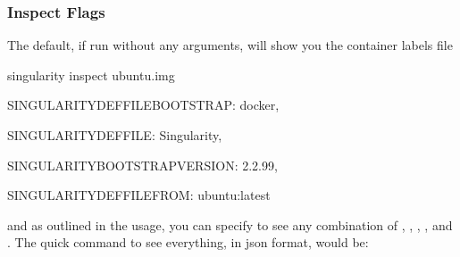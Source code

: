 \documentclass[letterpaper,10pt,english]{sphinxmanual}
\begin{document}
\subsubsection{Inspect Flags}
\label{\detokenize{appendix:inspect-flags}}
The default, if run without any arguments, will show you the container
labels file

%
\begin{sphinxVerbatim}[commandchars=\\\{\}]
\PYGZdl{} singularity inspect ubuntu.img

\PYGZob{}

    \PYGZdq{}SINGULARITY\PYGZus{}DEFFILE\PYGZus{}BOOTSTRAP\PYGZdq{}: \PYGZdq{}docker\PYGZdq{},

    \PYGZdq{}SINGULARITY\PYGZus{}DEFFILE\PYGZdq{}: \PYGZdq{}Singularity\PYGZdq{},

    \PYGZdq{}SINGULARITY\PYGZus{}BOOTSTRAP\PYGZus{}VERSION\PYGZdq{}: \PYGZdq{}2.2.99\PYGZdq{},

    \PYGZdq{}SINGULARITY\PYGZus{}DEFFILE\PYGZus{}FROM\PYGZdq{}: \PYGZdq{}ubuntu:latest\PYGZdq{}

\PYGZcb{}
\end{sphinxVerbatim}

and as outlined in the usage, you can specify to see any combination of 
,  ,  ,  , and . The quick command to see everything, in json format, would
be:
\end{document}
